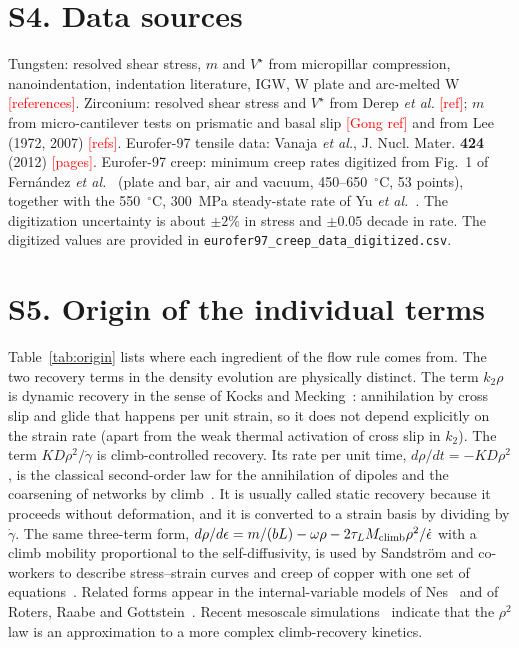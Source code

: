 \documentclass[aps,prl,onecolumn,superscriptaddress,amsmath,amssymb,floatfix]{revtex4-2}
\newcommand{\gd}{\dot\gamma}
\newcommand{\todo}[1]{\textcolor{red}{[#1]}}
\begin{document}
\section{S4. Data sources}
Tungsten: resolved shear stress, $m$ and $V^\star$ from micropillar compression, nanoindentation, indentation literature, IGW, W plate and arc-melted W \todo{references}. Zirconium: resolved shear stress and $V^\star$ from Derep \emph{et al.} \todo{ref}; $m$ from micro-cantilever tests on prismatic and basal slip \todo{Gong ref} and from Lee (1972, 2007) \todo{refs}. Eurofer-97 tensile data: Vanaja \emph{et al.}, J. Nucl. Mater. \textbf{424} (2012) \todo{pages}. Eurofer-97 creep: minimum creep rates digitized from Fig.~1 of Fern\'andez \emph{et al.}~\cite{S_Fern} (plate and bar, air and vacuum, 450--650~$^\circ$C, 53 points), together with the 550~$^\circ$C, 300~MPa steady-state rate of Yu \emph{et al.}~\cite{S_Yu}. The digitization uncertainty is about $\pm2\%$ in stress and $\pm0.05$ decade in rate. The digitized values are provided in \texttt{eurofer97\_creep\_data\_digitized.csv}.

\section{S5. Origin of the individual terms}
Table~\ref{tab:origin} lists where each ingredient of the flow rule comes from. The two recovery terms in the density evolution are physically distinct. The term $k_2\rho$ is dynamic recovery in the sense of Kocks and Mecking~\cite{S_Kocks1976,S_MK1981}: annihilation by cross slip and glide that happens per unit strain, so it does not depend explicitly on the strain rate (apart from the weak thermal activation of cross slip in $k_2$). The term $KD\rho^2/\gd$ is climb-controlled recovery. Its rate per unit time, $d\rho/dt=-KD\rho^2$, is the classical second-order law for the annihilation of dipoles and the coarsening of networks by climb~\cite{S_KMR1949,S_SL1975,S_S1977,S_Nes1995}. It is usually called static recovery because it proceeds without deformation, and it is converted to a strain basis by dividing by $\gd$. The same three-term form, $d\rho/d\epsilon=m/(bL)-\omega\rho-2\tau_LM_{\rm climb}\rho^2/\dot\epsilon$ with a climb mobility proportional to the self-diffusivity, is used by Sandstr\"om and co-workers to describe stress--strain curves and creep of copper with one set of equations~\cite{S_SL1975,S_SH2012}. Related forms appear in the internal-variable models of Nes~\cite{S_Nes1997} and of Roters, Raabe and Gottstein~\cite{S_RRG2000}. Recent mesoscale simulations~\cite{S_KC2022} indicate that the $\rho^2$ law is an approximation to a more complex climb-recovery kinetics.
\end{document}
